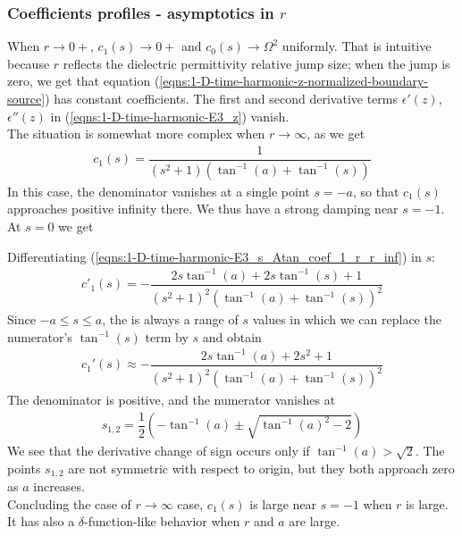 \documentclass[12pt,twoside]{article}
\begin{document}
\subsubsection{Coefficients profiles - asymptotics in $r$  } 
When $r \rightarrow 0+$, $c_1(s) \rightarrow 0+$ and $c_0(s)\rightarrow \Omega^2$ uniformly. That is intuitive because $r$ reflects the dielectric permittivity relative jump size; when the jump is zero, we get that equation (\ref{eqns:1-D-time-harmonic-z-normalized-boundary-source}) has constant coefficients. The first and second derivative terms $\epsilon'(z)$, $\epsilon''(z)$ in (\ref{eqns:1-D-time-harmonic-E3_z}) vanish.\\
The situation is somewhat more complex when $r \rightarrow \infty$, as we get
\begin{align}
\label{eqns:1-D-time-harmonic-E3_s_Atan_coef_1_r_r_inf}
c_1(s) = \dfrac{1}{\left(s^2+1\right) \left(\tan ^{-1}(a)+\tan ^{-1}(s)\right)}
\end{align}
In this case, the denominator vanishes at a single point $s = -a$, so that $c_1(s)$ approaches positive infinity there. We thus have a strong damping near $s=-1$. At $s=0$ we get

Differentiating (\ref{eqns:1-D-time-harmonic-E3_s_Atan_coef_1_r_r_inf}) in $s$:
\begin{align*}
c'_1(s)=-\dfrac{2 s \tan ^{-1}(a)+2 s \tan ^{-1}(s)+1}{\left(s^2+1\right)^2
   \left(\tan ^{-1}(a)+\tan ^{-1}(s)\right)^2}
\end{align*}
Since $-a \leq s \leq a$, the is always a range of $s$ values in which we can replace the numerator's $\tan^{-1}(s)$ term by $s$ and obtain
\begin{align*}
c_1'(s) \approx -\dfrac{2 s \tan ^{-1}(a)+2 s^2+1}{\left(s^2+1\right)^2 \left(\tan
   ^{-1}(a)+\tan^{-1}(s)\right)^2}
\end{align*}
The denominator is positive, and the numerator vanishes at
\begin{align*}
s_{1,2} = \dfrac{1}{2} \left(-\tan ^{-1}(a) \pm \sqrt{\tan ^{-1}(a)^2-2}\right)
\end{align*}
We see that the derivative change of sign occurs only if $\tan^{-1}(a)>\sqrt{2}$. The points $s_{1,2}$ are not symmetric with respect to origin, but they both approach zero as $a$ increases. \\
Concluding the case of $r \rightarrow \infty$ case, $c_1(s)$ is large near $s=-1$ when $r$ is large. It has also a $\delta$-function-like behavior when $r$ and $a$ are large.\\
\end{document}
